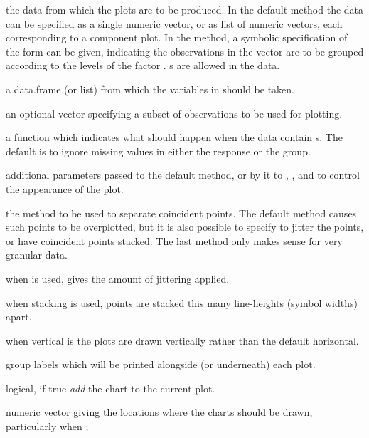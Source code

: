 %
\begin{Arguments}
\begin{ldescription}
\item[\code{x}] the data from which the plots are to be produced.  In the
default method the data can be specified as a single numeric
vector, or as list of numeric vectors, each corresponding to
a component plot.  In the  method, a symbolic
specification of the form  can be given,
indicating the observations in the vector  are to be
grouped according to the levels of the factor
.  s are allowed in the data.
\item[\code{data}] a data.frame (or list) from which the variables in
 should be taken.
\item[\code{subset}] an optional vector specifying a subset of observations
to be used for plotting.
\item[\code{na.action}] a function which indicates what should happen
when the data contain s.  The default is to ignore missing
values in either the response or the group.
\item[\code{...}] additional parameters passed to the default method, or by
it to , ,  and  to
control the appearance of the plot.
\item[\code{method}] the method to be used to separate coincident points.
The default method  causes such points to be
overplotted, but it is also possible to specify  to
jitter the points, or  have coincident points
stacked.  The last method only makes sense for very granular data.
\item[\code{jitter}] when  is used, 
gives the amount of jittering applied.
\item[\code{offset}] when stacking is used, points are stacked this many
line-heights (symbol widths) apart.
\item[\code{vertical}] when vertical is  the plots are drawn
vertically rather than the default horizontal.
\item[\code{group.names}] group labels which will be printed alongside
(or underneath) each plot.
\item[\code{add}] logical, if true \emph{add} the chart to the current plot.
\item[\code{at}] numeric vector giving the locations where the charts should
be drawn, particularly when ;

\end{ldescription}
\end{Arguments}
